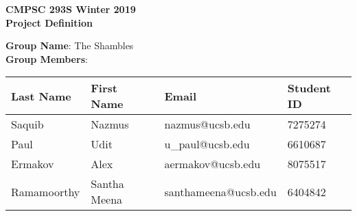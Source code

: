 \documentclass[12pt]{article}
\begin{document}
\begin{center}
\bfseries
\LARGE
CMPSC 293S Winter 2019\\
Project Definition\\[2em]
\end{center}

\noindent
\textbf{Group Name}: The Shambles\\
\noindent
\textbf{Group Members}:
\begin{table}[h]
\centering
\begin{tabular}{|l|l|l|l|}
\hline
\textbf{Last Name} & \textbf{First Name} & \textbf{Email} & \textbf{Student ID}\\
\hline
Saquib & Nazmus & nazmus@ucsb.edu & 7275274\\
\hline
Paul & Udit & u\_paul@ucsb.edu & 6610687\\
\hline
Ermakov & Alex & aermakov@ucsb.edu & 8075517\\
\hline
Ramamoorthy & Santha Meena & santhameena@ucsb.edu & 6404842\\
\hline
\end{tabular}
\end{table}
\end{document}

